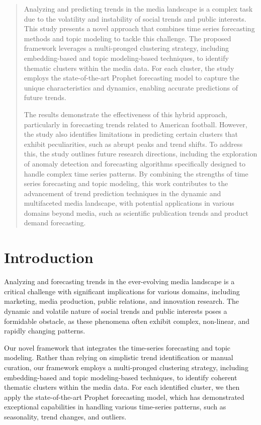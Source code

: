 \maketitle
\begin{abstract}
Analyzing and predicting trends in the media landscape is a complex task due to the volatility and instability of social trends and public interests. This study presents a novel approach that combines time series forecasting methods and topic modeling to tackle this challenge. The proposed framework leverages a multi-pronged clustering strategy, including embedding-based and topic modeling-based techniques, to identify thematic clusters within the media data. For each cluster, the study employs the state-of-the-art Prophet forecasting model to capture the unique characteristics and dynamics, enabling accurate predictions of future trends.

The results demonstrate the effectiveness of this hybrid approach, particularly in forecasting trends related to American football. However, the study also identifies limitations in predicting certain clusters that exhibit peculiarities, such as abrupt peaks and trend shifts. To address this, the study outlines future research directions, including the exploration of anomaly detection and forecasting algorithms specifically designed to handle complex time series patterns. By combining the strengths of time series forecasting and topic modeling, this work contributes to the advancement of trend prediction techniques in the dynamic and multifaceted media landscape, with potential applications in various domains beyond media, such as scientific publication trends and product demand forecasting.
\end{abstract}



\section{Introduction}
Analyzing and forecasting trends in the ever-evolving media landscape is a critical challenge with significant implications for various domains, including marketing, media production, public relations, and innovation research. The dynamic and volatile nature of social trends and public interests poses a formidable obstacle, as these phenomena often exhibit complex, non-linear, and rapidly changing patterns.

Our novel framework that integrates the time-series forecasting and topic modeling. Rather than relying on simplistic trend identification or manual curation, our framework employs a multi-pronged clustering strategy, including embedding-based and topic modeling-based techniques, to identify coherent thematic clusters within the media data. For each identified cluster, we then apply the state-of-the-art Prophet forecasting model, which has demonstrated exceptional capabilities in handling various time-series patterns, such as seasonality, trend changes, and outliers.

